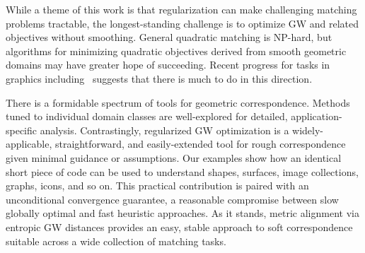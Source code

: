 While a theme of this work is that regularization can make challenging matching problems tractable, the longest-standing challenge is to optimize GW and related objectives without smoothing.  General quadratic matching is NP-hard, but algorithms for minimizing quadratic objectives derived from smooth geometric domains may have greater hope of succeeding.  Recent progress for tasks in graphics including~\cite{chen-2015,wei-2015} suggests that there is much to do in this direction.

There is a formidable spectrum of tools for geometric correspondence.  Methods tuned to individual domain classes are well-explored for detailed, application-specific analysis.  Contrastingly, regularized GW optimization is a widely-applicable, straightforward, and easily-extended tool for rough correspondence given minimal guidance or assumptions.  Our examples show how an identical short piece of code can be used to understand shapes, surfaces, image collections, graphs, icons, and so on.  This practical contribution is paired with an unconditional convergence guarantee, a reasonable compromise between slow globally optimal and fast heuristic approaches.  As it stands, metric alignment via entropic GW distances provides an easy, stable approach to soft correspondence suitable across a wide collection of matching tasks.  